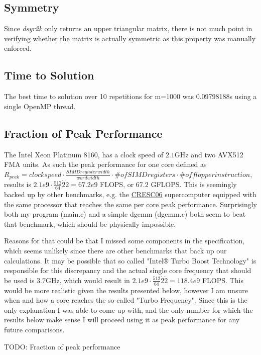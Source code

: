 \documentclass{scrartcl}
\begin{document}
\subsection{Symmetry}
Since \emph{dsyr2k} only returns an upper triangular matrix, there is not much point in verifying whether the matrix is actually symmetric as this property was manually enforced. 

\subsection{Time to Solution}

The best time to solution over 10 repetitions for m=1000 was 0.09798188s using a single OpenMP thread.

\subsection{Fraction of Peak Performance}
The Intel Xeon Platinum 8160, has a clock speed of $2.1$GHz and two AVX512 FMA units.
As such the peak performance for one core defined as $R_{peak} = clock speed \cdot \frac{SIMD register width}{word width} \cdot \# of SIMD registers \cdot \# of flop per instruction$,
results is $2.1e9 \cdot \frac{512}{64} \dot 2 \dot 2 = 67.2e9$ FLOPS, or $67.2$ GFLOPS.
This is seemingly backed up by other benchmarks, e.g. the \href{https://www.top500.org/system/179574/}{CRESC06} supercomputer equipped with the same processor that reaches the same per core peak performance.
Surprisingly both my program (main.c) and a simple dgemm (dgemm.c) both seem to beat that benchmark, which should be physically impossible.

Reasons for that could be that I missed some components in the specification, which seems unlikely since there are other benchmarks that back up our calculations.
It may be possible that so called "Intel® Turbo Boost Technology" is responsible for this discrepancy and the actual single core frequency that should be used is $3.7$GHz, which would result in $2.1e9 \cdot \frac{512}{64} \dot 2 \dot 2 = 118.4e9$ FLOPS.
This would be more realistic given the results presented below, however I am unsure when and how a core reaches the so-called "Turbo Frequency".
Since this is the only explanation I was able to come up with, and the only number for which the results below make sense I will proceed using it as peak performance for any future comparisons.

TODO: Fraction of peak performance
\end{document}
